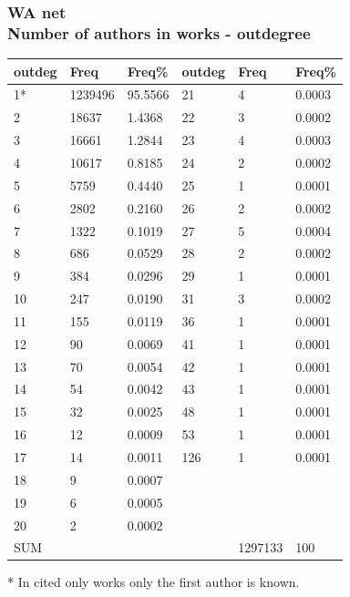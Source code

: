 \documentclass[hyperref={pdfstartview={FitBH -32768},
                         pdfpagemode=FullScreen,
                         plainpages=false,
                         colorlinks=true}
              ]{beamer}
\begin{document}
\begin{frame}[fragile]
\frametitle{WA net \label{numpap}\\ \normalsize Number of authors in works - outdegree}
\renewcommand{\arraystretch}{0.85}
\tiny
\begin{center}
\begin{tabular}{l|l|l||l|l|l}
outdeg&  	Freq&  	Freq\% &  	outdeg&   Freq &	Freq\%\\ \hline   
1*&  	1239496&  	95.5566&  	21&  	4&  	0.0003\\
2&  	18637&  	1.4368&  	22&  	3&  	0.0002\\
3&  	16661&  	1.2844&  	23&  	4&  	0.0003\\
4&  	10617&  	0.8185&  	24&  	2&  	0.0002\\
5&  	5759&  	0.4440&  	25&  	1&  	0.0001\\
6&  	2802&  	0.2160&  	26&  	2&  	0.0002\\
7&  	1322&  	0.1019&  	27&  	5&  	0.0004\\
8&  	686&  	0.0529&  	28&  	2&  	0.0002\\
9&  	384&  	0.0296&  	29&  	1&  	0.0001\\
10&  	247&  	0.0190&  	31&  	3&  	0.0002\\
11&  	155&  	0.0119&  	36&  	1&  	0.0001\\
12&  	90&  	0.0069&  	41&  	1&  	0.0001\\
13&  	70&  	0.0054&  	42&  	1&  	0.0001\\
14&  	54&  	0.0042&  	43&  	1&  	0.0001\\
15&  	32&  	0.0025&  	48&  	1&  	0.0001\\
16&  	12&  	0.0009&  	53&  	1&  	0.0001\\
17&  	14&  	0.0011&  	126&  	1&  	0.0001\\
18&  	9&  	0.0007&  	  & 	 & 	\\
19&  	6&  	0.0005&  	 &	 &	\\
20&  	2&  	0.0002&  	&	 &	\\ \hline
SUM &     &              &       &  1297133 & 100  \\ \hline   
\end{tabular}
\end{center}
* In cited only works only the first author is known. 

\medskip


\end{frame}
\end{document}
